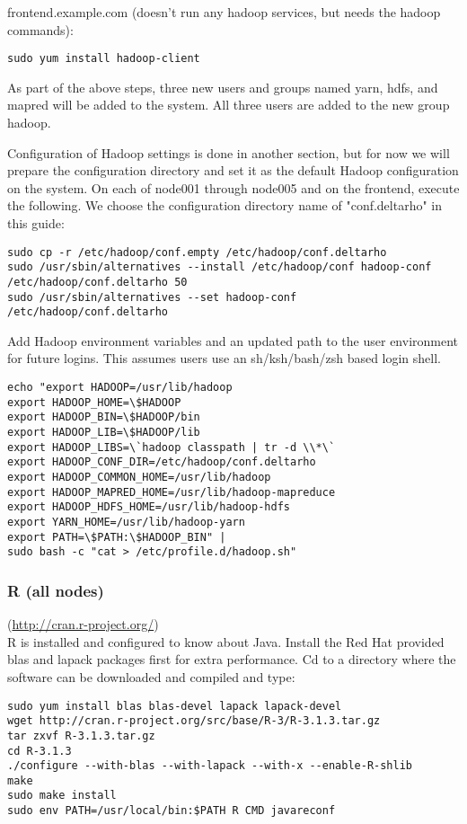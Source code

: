frontend.example.com (doesn't run any hadoop services, but needs the hadoop commands):
\begin{verbatim}
sudo yum install hadoop-client
\end{verbatim}

As part of the above steps, three new users and groups named yarn, hdfs,
and mapred will be added to the system.  All three users are added to
the new group hadoop.

Configuration of Hadoop settings is done in another section, but for now
we will prepare the configuration directory and set it as the default
Hadoop configuration on the system.  On each of node001 through node005
and on the frontend, execute the following.  We choose the configuration
directory name of "conf.deltarho" in this guide:

\begin{verbatim}
sudo cp -r /etc/hadoop/conf.empty /etc/hadoop/conf.deltarho
sudo /usr/sbin/alternatives --install /etc/hadoop/conf hadoop-conf /etc/hadoop/conf.deltarho 50
sudo /usr/sbin/alternatives --set hadoop-conf /etc/hadoop/conf.deltarho
\end{verbatim}

Add Hadoop environment variables and an updated path to the user
environment for future logins.  This assumes users use an sh/ksh/bash/zsh
based login shell.

\begin{verbatim}
echo "export HADOOP=/usr/lib/hadoop
export HADOOP_HOME=\$HADOOP
export HADOOP_BIN=\$HADOOP/bin
export HADOOP_LIB=\$HADOOP/lib
export HADOOP_LIBS=\`hadoop classpath | tr -d \\*\`
export HADOOP_CONF_DIR=/etc/hadoop/conf.deltarho
export HADOOP_COMMON_HOME=/usr/lib/hadoop
export HADOOP_MAPRED_HOME=/usr/lib/hadoop-mapreduce
export HADOOP_HDFS_HOME=/usr/lib/hadoop-hdfs
export YARN_HOME=/usr/lib/hadoop-yarn
export PATH=\$PATH:\$HADOOP_BIN" |
sudo bash -c "cat > /etc/profile.d/hadoop.sh"
\end{verbatim}

\subsubsection{R (all nodes)} (\url{http://cran.r-project.org/})\\
R is installed and configured to know about Java.  Install the Red Hat
provided blas and lapack packages first for extra performance.  Cd to
a directory where the software can be downloaded and compiled and type:
\begin{verbatim}
sudo yum install blas blas-devel lapack lapack-devel
wget http://cran.r-project.org/src/base/R-3/R-3.1.3.tar.gz
tar zxvf R-3.1.3.tar.gz
cd R-3.1.3
./configure --with-blas --with-lapack --with-x --enable-R-shlib
make
sudo make install
sudo env PATH=/usr/local/bin:$PATH R CMD javareconf
\end{verbatim}

